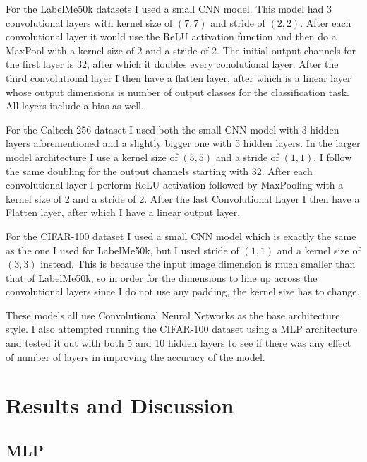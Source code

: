 \documentclass{article}
\theoremstyle{plain}
\theoremstyle{definition}
\theoremstyle{remark}
\begin{document}
For the LabelMe50k datasets I used a small CNN model. This model had 3 convolutional layers with kernel size of \((7,7)\)
and stride of \((2,2)\). After each convolutional layer it would use the ReLU activation function and then do a MaxPool with a kernel size of 2 and 
a stride of 2. The initial output channels for the first layer is 32, after which it doubles every conolutional layer. After the third convolutional layer 
I then have a flatten layer, after which is a linear layer whose output dimensions is number of output classes for the classification task. All layers 
include a bias as well. 

For the Caltech-256 dataset I used both the small CNN model with 3 hidden layers aforementioned and a slightly bigger one with 5 hidden layers.
In the larger model architecture I use a kernel size of \((5,5)\) and a stride of \((1,1)\). I follow the same doubling for the output channels 
starting with 32. After each convolutional layer I perform ReLU activation followed by MaxPooling with a kernel size of 2 and a stride of 2.
After the last Convolutional Layer I then have a Flatten layer, after which I have a linear output layer.

For the CIFAR-100 dataset I used a small CNN model which is exactly the same as the one I used for LabelMe50k, but I used stride of \((1,1)\) and 
a kernel size of \((3,3)\) instead. This is because the input image dimension is much smaller than that of LabelMe50k, so in order for the dimensions to line up 
across the convolutional layers since I do not use any padding, the kernel size has to change.

These models all use Convolutional Neural Networks as the base architecture style. I also attempted running the CIFAR-100 dataset using 
a MLP architecture and tested it out with both 5 and 10 hidden layers to see if there was any effect of number of layers in improving the accuracy of the model.

\section{Results and Discussion}

\subsection*{MLP}
\end{document}
